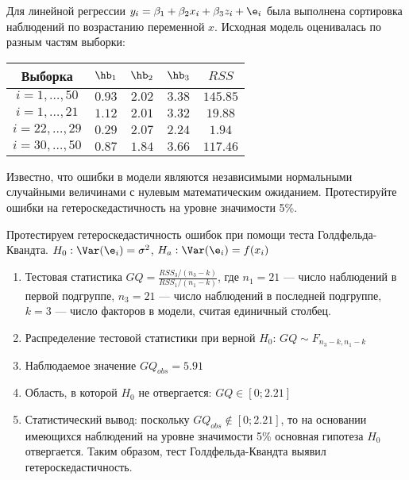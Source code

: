 \documentclass[pdftex,11pt,openany]{book}\usepackage[]{graphicx}\usepackage[]{color}
\begin{document}
\begin{problem}
Для линейной регрессии $y_i = \beta_1 + \beta_2 x_i + \beta_3 z_i + \e_i$ была выполнена сортировка наблюдений по возрастанию переменной $x$. Исходная модель оценивалась по разным частям выборки:

\begin{tabular}{c|cccc}
Выборка & $\hb_1$ & $\hb_2$ & $\hb_3$ & $RSS$ \\

\hline
$i=1,\ldots, 50$ & $0.93$ & $2.02$ & $3.38$ & $145.85$ \\
$i=1,\ldots, 21$ & $1.12$ & $2.01$ & $3.32$ & $19.88$ \\
$i=22,\ldots, 29$ & $0.29$ & $2.07$ & $2.24$ & $1.94$ \\
$i=30,\ldots, 50$ & $0.87$ & $1.84$ & $3.66$ & $117.46$ \\
\end{tabular}

Известно, что ошибки в модели являются независимыми нормальными случайными величинами с нулевым математическим ожиданием. Протестируйте
ошибки на гетероскедастичность на уровне значимости 5\%.
\end{problem}
\begin{solution}
Протестируем гетероскедастичность ошибок при помощи теста Голдфельда-
Квандта. $H_0: \Var(\e_i)=\sigma^2$, $H_a: \Var(\e_i)=f(x_i)$

\begin{enumerate}
\item Тестовая статистика $GQ=\frac{RSS_3/(n_3-k)}{RSS_1/(n_1-k)}$, где $n_1=21$ --- число наблюдений в первой подгруппе, $n_3=21$ --- число наблюдений в
последней подгруппе, $k=3$ --- число факторов в модели, считая единичный столбец.
\item Распределение тестовой статистики при верной $H_0$: $GQ\sim F_{n_3-k,n_1-k}$
\item Наблюдаемое значение $GQ_{obs}=5.91$
\item Область, в которой $H_0$ не отвергается: $GQ\in [0;2.21]$
\item Статистический вывод: поскольку $GQ_{obs} \notin [0;2.21]$, то на основании имеющихся наблюдений на уровне значимости 5\% основная гипотеза $H_0$ отвергается. Таким образом, тест Голдфельда-Квандта выявил гетероскедастичность.
\end{enumerate}
\end{solution}
\end{document}
